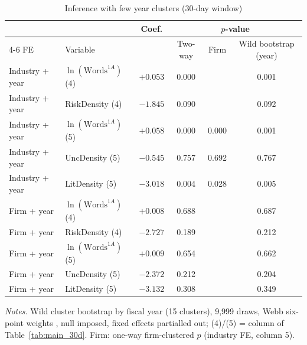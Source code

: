 \begin{table}[htbp]
\centering\shorthandoff{-}
\caption{Inference with few year clusters (30-day window)}
\label{tab:inference}
\small
\begin{tabular}{llcccc}
\toprule
 & & Coef. & \multicolumn{3}{c}{$p$-value} \\ \cmidrule(lr){4-6}
FE & Variable & & Two-way & Firm & Wild bootstrap (year) \\
\midrule
Industry + year & $\ln(\text{Words}^{1A})$ (4) & $+0.053$ & 0.000 &  & 0.001 \\
Industry + year & RiskDensity (4) & $-1.845$ & 0.090 &  & 0.092 \\
Industry + year & $\ln(\text{Words}^{1A})$ (5) & $+0.058$ & 0.000 & 0.000 & 0.001 \\
Industry + year & UncDensity (5) & $-0.545$ & 0.757 & 0.692 & 0.767 \\
Industry + year & LitDensity (5) & $-3.018$ & 0.004 & 0.028 & 0.005 \\
Firm + year & $\ln(\text{Words}^{1A})$ (4) & $+0.008$ & 0.688 &  & 0.687 \\
Firm + year & RiskDensity (4) & $-2.727$ & 0.189 &  & 0.212 \\
Firm + year & $\ln(\text{Words}^{1A})$ (5) & $+0.009$ & 0.654 &  & 0.662 \\
Firm + year & UncDensity (5) & $-2.372$ & 0.212 &  & 0.204 \\
Firm + year & LitDensity (5) & $-3.132$ & 0.308 &  & 0.349 \\
\bottomrule
\end{tabular}
\par\smallskip
\begin{minipage}{\linewidth}\footnotesize
\emph{Notes.} Wild cluster bootstrap by fiscal year (15 clusters), 9,999 draws, Webb six-point weights \parencite{webb2023}, null imposed, fixed effects partialled out; (4)/(5) = column of Table~\ref{tab:main_30d}. Firm: one-way firm-clustered $p$ (industry FE, column 5).
\end{minipage}
\end{table}
